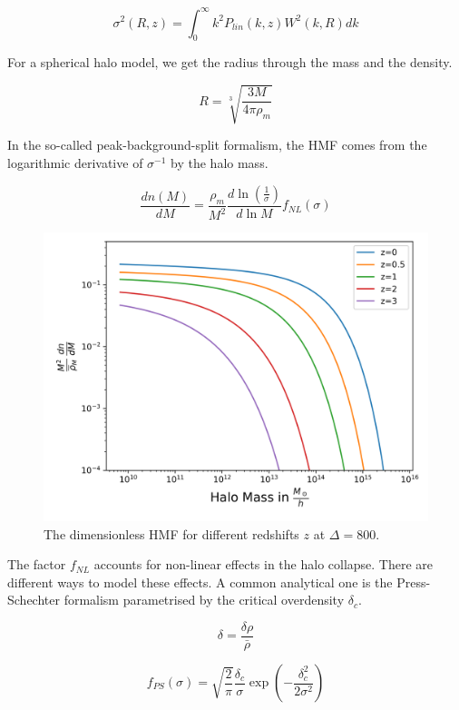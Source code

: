 \begin{equation}
    \sigma^2(R, z) = \int_0^\infty k^2 P_{lin}(k, z) W^2(k, R) dk
\end{equation}

For a spherical halo model, we get the radius through the mass and the density.

\begin{equation}
    R= \sqrt[3]{\frac{3M}{4\pi \rho_m}}
\end{equation}

In the so-called peak-background-split formalism, the HMF comes from the logarithmic derivative of $\sigma^{-1}$ by the halo mass.

\begin{equation}
    \frac{dn(M)}{dM }=\frac{\rho_m}{M^2}\frac{d\ln (\frac{1}{\sigma})}{d\ln M}f_{NL}(\sigma)
\end{equation}



\begin{figure}
    \centering
    \includegraphics[width=0.8\linewidth, clip]{Images/HMF_diff_z.png}
    \caption{The dimensionless HMF for different redshifts $z$ at $\Delta=800$.}
    \label{HMF_z}
\end{figure} 


The factor $f_{NL}$ accounts for non-linear effects in the halo collapse. There are different ways to model these effects. A common analytical one is the Press-Schechter formalism parametrised by the critical overdensity $\delta_c$.

\begin{equation}
    \delta = \frac{\delta \rho}{\bar{\rho}}
\end{equation}

\begin{equation}
    f_{PS}(\sigma)=\sqrt{\frac{2}{\pi}} \frac{\delta_c}{\sigma}\exp(-\frac{\delta_c^2}{2\sigma^2})
\end{equation}

